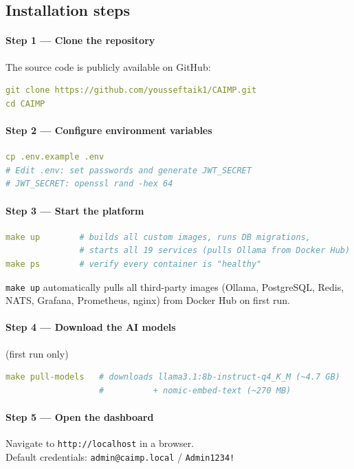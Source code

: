 \subsection{Installation steps}

\paragraph{Step 1 — Clone the repository}
The source code is publicly available on GitHub:
\begin{lstlisting}[language=YAML]
git clone https://github.com/yousseftaik1/CAIMP.git
cd CAIMP
\end{lstlisting}

\paragraph{Step 2 — Configure environment variables}
\begin{lstlisting}[language=YAML]
cp .env.example .env
# Edit .env: set passwords and generate JWT_SECRET
# JWT_SECRET: openssl rand -hex 64
\end{lstlisting}

\paragraph{Step 3 — Start the platform}
\begin{lstlisting}[language=YAML]
make up        # builds all custom images, runs DB migrations,
               # starts all 19 services (pulls Ollama from Docker Hub)
make ps        # verify every container is "healthy"
\end{lstlisting}

\noindent \texttt{make up} automatically pulls all third-party images (Ollama,
PostgreSQL, Redis, NATS, Grafana, Prometheus, nginx) from Docker Hub on first run.

\paragraph{Step 4 — Download the AI models} (first run only)
\begin{lstlisting}[language=YAML]
make pull-models   # downloads llama3.1:8b-instruct-q4_K_M (~4.7 GB)
                   #          + nomic-embed-text (~270 MB)
\end{lstlisting}

\paragraph{Step 5 — Open the dashboard}
Navigate to \texttt{http://localhost} in a browser.\\
Default credentials: \texttt{admin@caimp.local} / \texttt{Admin1234!}

